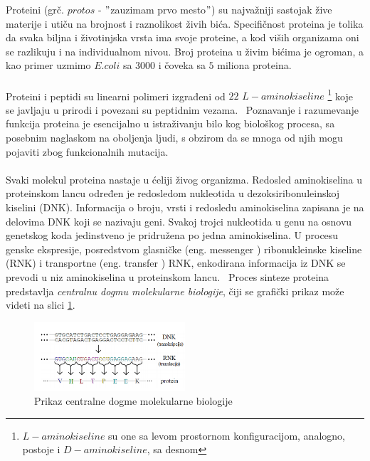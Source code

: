 \documentclass[a4paper]{article}
\begin{document}
Proteini (grč. $protos$ - $"$zauzimam prvo mesto$"$) su najvažniji sastojak žive materije i utiču na brojnost i raznolikost živih bića. Specifičnost proteina je tolika da svaka biljna i životinjska vrsta ima svoje proteine, a kod viših organizama oni se razlikuju i na individualnom nivou. Broj proteina u živim bićima je ogroman, a kao primer uzmimo $E. coli$ sa $3000$ i čoveka sa $5$ miliona proteina.~\cite{spasic} \\\\
Proteini i peptidi su linearni polimeri izgrađeni od $22$ $L-aminokiseline$ \footnote{$L-aminokiseline$ su one sa levom prostornom konfiguracijom, analogno, postoje i $D-aminokiseline$, sa desnom} koje se javljaju u prirodi i povezani su peptidnim vezama.~\cite{biopathways} Poznavanje
i razumevanje funkcija proteina je esencijalno u istraživanju bilo kog
biološkog procesa, sa posebnim naglaskom na oboljenja ljudi, s obzirom da
se mnoga od njih mogu pojaviti zbog funkcionalnih mutacija.~\cite{JKd}\\\\
Svaki molekul proteina nastaje u ćeliji živog organizma. Redosled aminokiselina u proteinskom lancu određen je redosledom nukleotida u dezoksiribonuleinskoj kiselini (DNK). Informacija o broju, vrsti i redosledu aminokiselina zapisana je na delovima DNK koji se nazivaju geni. Svakoj trojci nukleotida u genu na osnovu genetskog koda jedinstveno je pridružena po jedna aminokiselina. U procesu genske ekspresije, posredstvom glasničke
(eng. messenger ) ribonukleinske kiseline (RNK) i transportne (eng. transfer
) RNK, enkodirana informacija iz DNK se prevodi u niz aminokiselina u
proteinskom lancu.~\cite{JKd}
Proces sinteze proteina predstavlja \textit{centralnu dogmu molekularne biologije}, čiji se grafički prikaz može videti na slici \ref{fig:dogma}.
\begin{figure}[h]
	\centering
    \includegraphics[width=0.5\textwidth]{Pictures/dogma.png}
    \caption{Prikaz centralne dogme molekularne biologije~\cite{JKd}}
    \label{fig:dogma}
\end{figure}
\end{document}
